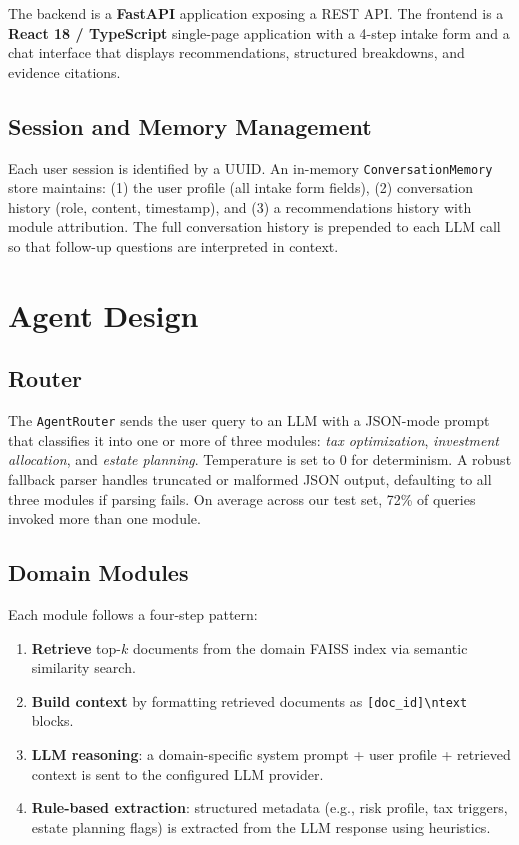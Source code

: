 \documentclass[sigplan,screen]{acmart}
\begin{document}
The backend is a \textbf{FastAPI} application exposing a REST API.
The frontend is a \textbf{React 18 / TypeScript} single-page application with a 4-step intake form and a chat interface that displays recommendations, structured breakdowns, and evidence citations.

\subsection{Session and Memory Management}

Each user session is identified by a UUID.
An in-memory \texttt{ConversationMemory} store maintains: (1) the user profile (all intake form fields), (2) conversation history (role, content, timestamp), and (3) a recommendations history with module attribution.
The full conversation history is prepended to each LLM call so that follow-up questions are interpreted in context.

\section{Agent Design}

\subsection{Router}

The \texttt{AgentRouter} sends the user query to an LLM with a JSON-mode prompt that classifies it into one or more of three modules: \emph{tax optimization}, \emph{investment allocation}, and \emph{estate planning}.
Temperature is set to 0 for determinism.
A robust fallback parser handles truncated or malformed JSON output, defaulting to all three modules if parsing fails.
On average across our test set, 72\% of queries invoked more than one module.

\subsection{Domain Modules}

Each module follows a four-step pattern:
\begin{enumerate}
  \item \textbf{Retrieve} top-$k$ documents from the domain FAISS index via semantic similarity search.
  \item \textbf{Build context} by formatting retrieved documents as \texttt{[doc\_id]\textbackslash ntext} blocks.
  \item \textbf{LLM reasoning}: a domain-specific system prompt + user profile + retrieved context is sent to the configured LLM provider.
  \item \textbf{Rule-based extraction}: structured metadata (e.g., risk profile, tax triggers, estate planning flags) is extracted from the LLM response using heuristics.
\end{enumerate}
\end{document}
